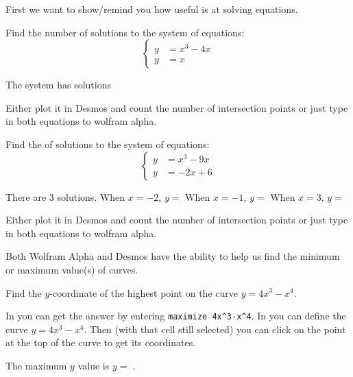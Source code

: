 \documentclass{ximera}
\begin{document}
First we want to show/remind you how useful  is at solving equations.

\begin{question}
Find the number of solutions to the system of equations:
\[
\begin{cases}
y&=x^3-4x\\
y&=x
\end{cases}
\]
\begin{solution}
The system has  solutions
\begin{hint}
Either plot it in Desmos and count the number of intersection points or just type in both equations to wolfram alpha.
\end{hint}
\end{solution}
\end{question}



\begin{question}
Find the of solutions to the system of equations:
\[
\begin{cases}
y&=x^3-9x\\
y&=-2x+6
\end{cases}
\]
\begin{solution}
There are $3$ solutions. 
When $x=-2$, $y=$ 
When $x=-1$, $y=$ 
When $x=3$, $y=$ 

\begin{hint}
Either plot it in Desmos and count the number of intersection points or just type in both equations to wolfram alpha.
\end{hint}
\end{solution}
\end{question}

Both Wolfram Alpha and Desmos have the ability to help us find the minimum or maximum value(s) of curves. 

\begin{question}
Find the $y$-coordinate of the highest point on the curve $y=4x^3-x^4$. 

In  you can  get the answer by entering \verb|maximize 4x^3-x^4|. In  you can define the curve $y=4x^3-x^4$. Then (with that cell still selected) you can click on the point at the top of the curve to get its coordinates.

\begin{solution}
The maximum $y$ value is $y=$ .
\end{solution}
\end{question}
\end{document}
